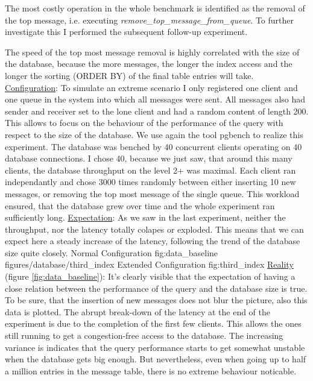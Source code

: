 \documentclass[11pt]{article}
\begin{document}
The most costly operation in the whole benchmark is identified as the removal of the top message, i.e. executing \textit{remove\_top\_message\_from\_queue}. To further investigate this I performed the subsequent follow-up experiment.

The speed of the top most message removal is highly correlated with the size of the database, because the more messages, the longer the index access and the longer the sorting (ORDER BY) of the final table entries will take.
\newline\underline{Configuration}: To simulate an extreme scenario I only registered one client and one queue in the system into which all messages were sent. All messages also had sender and receiver set to the lone client and had a random content of length 200. This allows to focus on the behaviour of the performance of the query with respect to the size of the database. We use again the tool pgbench to realize this experiment. The database was benched by 40 concurrent clients operating on 40 database connections. I chose 40, because we just saw, that around this many clients, the database throughput on the level 2+ was maximal. Each client ran independantly and chose 3000 times randomly between either inserting 10 new messages, or removing the top most message of the single queue. This workload ensured, that the database grew over time and the whole experiment ran sufficiently long.
\newline\underline{Expectation}: As we saw in the last experiment, neither the throughput, nor the latency totally colapes or exploded. This means that we can expect here a steady increase of the latency, following the trend of the database size quite closely.
 {Normal Configuration} {fig:data_baseline}
		{figures/database/third_index} {Extended Configuration} {fig:third_index}
\newline\underline{Reality} (figure \ref{fig:data_baseline}): It's clearly visible that the expectation of having a close relation between the performance of the query and the database size is true. To be sure, that the insertion of new messages does not blur the picture, also this data is plotted. The abrupt break-down of the latency at the end of the experiment is due to the completion of the first few clients. This allows the ones still running to get a congestion-free access to the database. The increasing variance is indicates that the query performance starts to get somewhat unstable when the database gets big enough. But nevertheless, even when going up to half a million entries in the message table, there is no extreme behaviour noticable.
\end{document}
